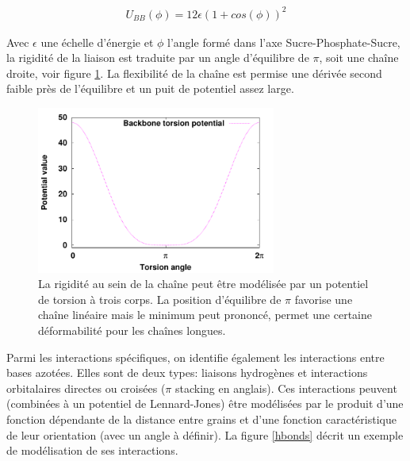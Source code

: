 \begin{eqnarray}
U_{BB}(\phi)= 12\epsilon \left( 1+cos(\phi)\right)^{2}
\end{eqnarray}

\noindent Avec $\epsilon$ une échelle d'énergie et $\phi$ l'angle formé dans l'axe Sucre-Phosphate-Sucre, la rigidité de la liaison est traduite par un angle d'équilibre de $\pi$, soit une chaîne droite, voir figure \ref{torsion}. La flexibilité de la chaîne est permise une dérivée second faible près de l'équilibre et un puit de potentiel assez large.

\begin{figure}[H]
\begin{center}
\includegraphics[width=0.7\textwidth]{backbone.pdf}

\caption[Potentiel de torsion]{La rigidité au sein de la chaîne peut être modélisée par un potentiel de torsion à trois corps. La position d'équilibre de $\pi$ favorise une chaîne linéaire mais le minimum peut prononcé, permet une certaine déformabilité pour les chaînes longues.}
\label{torsion}
\end{center}
\end{figure}

Parmi les interactions spécifiques, on identifie également les interactions entre bases azotées. Elles sont de deux types: liaisons hydrogènes et interactions orbitalaires directes ou croisées ($\pi$ stacking en anglais). Ces interactions peuvent (combinées à un potentiel de Lennard-Jones) être modélisées par le produit d'une fonction dépendante de la distance entre grains et d'une fonction caractéristique de leur orientation (avec un angle à définir). La figure \ref{hbonds} décrit un exemple de modélisation de ses interactions.


